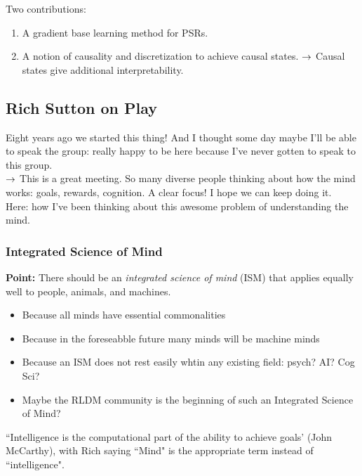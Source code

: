 Two contributions:
\begin{enumerate}
    \item A gradient base learning method for PSRs.
    \item A notion of causality and discretization to achieve causal states.
    $\rightarrow$ Causal states give additional interpretability.
\end{enumerate}


\spacerule

\subsection{Rich Sutton on Play}

Eight years ago we started this thing! And I thought some day maybe I'll be able to speak the group: really happy to be here because I've never gotten to speak to this group. \\

$\rightarrow$ This is a great meeting. So many diverse people thinking about how the mind works: goals, rewards, cognition. A clear focus! I hope we can keep doing it. \\

Here: how I've been thinking about this awesome problem of understanding the mind. \\

\subsubsection{Integrated Science of Mind}

{\bf Point:} There should be an {\it integrated science of mind} (ISM) that applies equally well to people, animals, and machines.
\begin{itemize}
    \item Because all minds have essential commonalities
    \item Because in the foreseabble future many minds will be machine minds
    \item Because an ISM does not rest easily whtin any existing field: psych? AI? Cog Sci?
    \item Maybe the RLDM community is the beginning of such an Integrated Science of Mind?
\end{itemize}

``Intelligence is the computational part of the ability to achieve goals' (John McCarthy), with Rich saying ``Mind" is the appropriate term instead of ``intelligence". \\

